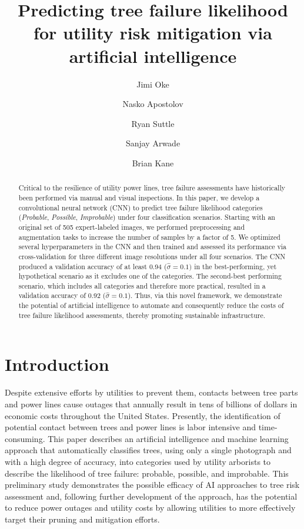 \documentclass[Journal, letterpaper, DoubleSpace, InsideFigs]{ascelike-new}
\begin{document}
\title{Predicting tree failure likelihood for utility risk mitigation via artificial intelligence}
\author[1]{Jimi Oke}
\author[1]{Nasko Apostolov}
\author[2]{Ryan Suttle}
\author[1]{Sanjay Arwade}
\author[2]{Brian Kane}


\maketitle

\begin{abstract}
  Critical to the resilience of utility power lines, tree failure assessments have historically been performed via
  manual and visual inspections.  In this paper, we develop a convolutional neural network (CNN) to predict tree failure
  likelihood categories (\textit{Probable}, \textit{Possible}, \textit{Improbable}) under four classification scenarios.
  Starting with an original set of 505 expert-labeled images, we performed preprocessing and augmentation tasks to
  increase the number of samples by a factor of 5. We optimized several hyperparameters in the CNN and then trained and assessed its performance via cross-validation
  for three different image resolutions under all four scenarios. The CNN produced a validation accuracy of at least 0.94
  ($\hat\sigma = 0.1)$ in the best-performing, yet hypothetical scenario as it excludes one of the categories.  The
  second-best performing scenario, which includes all categories and therefore more practical, resulted in a validation
  accuracy of 0.92 ($\hat\sigma = 0.1$). Thus, via this novel framework, we demonstrate the potential of artificial
  intelligence to automate and consequently reduce the costs of tree failure likelihood assessments, thereby promoting
  sustainable infrastructure.
\end{abstract}

\section{Introduction}
Despite extensive efforts by utilities to prevent them, contacts between tree parts and power lines cause outages that annually result in tens of billions of dollars in economic costs throughout the United States.  Presently, the identification of potential contact between trees and power lines is labor intensive and time-consuming.  This paper describes an artificial intelligence and machine learning approach that automatically classifies trees, using only a single photograph and with a high degree of accuracy, into categories used by utility arborists to describe the likelihood of tree failure: probable, possible, and improbable.  This preliminary study demonstrates the possible efficacy of AI approaches to tree risk assessment and, following further development of the approach, has the potential to reduce power outages and utility costs by allowing utilities to more effectively target their pruning and mitigation efforts.  
\end{document}
